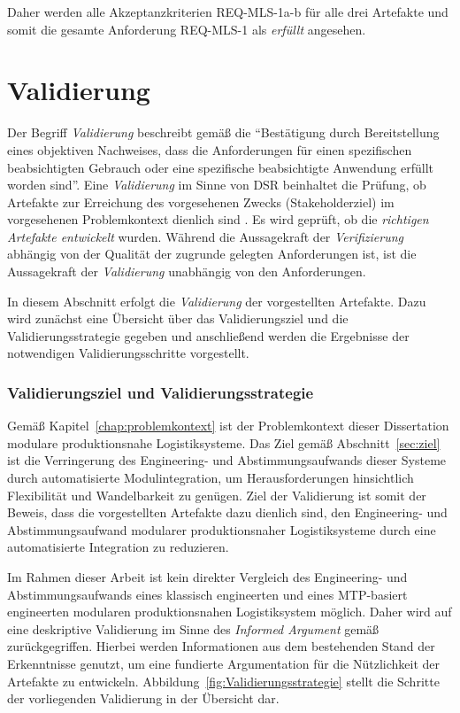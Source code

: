 Daher werden alle Akzeptanzkriterien REQ-MLS-1a-b für alle drei Artefakte und somit die gesamte Anforderung REQ-MLS-1 als \emph{erfüllt} angesehen.


\section{Validierung}
\label{sec:Validierung}

Der Begriff \emph{Validierung} beschreibt gemäß \cite{DINNormenausschussQualitatsmanagementStatistikundZertifizierungsgrundlagen.2015} die \enquote{Bestätigung durch Bereitstellung eines objektiven Nachweises, dass die Anforderungen für einen spezifischen beabsichtigten Gebrauch oder eine spezifische beabsichtigte Anwendung erfüllt worden sind}. Eine \emph{Validierung} im Sinne von DSR beinhaltet die Prüfung, ob Artefakte zur Erreichung des vorgesehenen Zwecks (Stakeholderziel) im vorgesehenen Problemkontext dienlich sind \cite{Wieringa.2014}. Es wird geprüft, ob die \emph{richtigen Artefakte entwickelt} wurden. Während die Aussagekraft der \emph{Verifizierung} abhängig von der Qualität der zugrunde gelegten Anforderungen ist, ist die Aussagekraft der \emph{Validierung} unabhängig von den Anforderungen.

In diesem Abschnitt erfolgt die \emph{Validierung} der vorgestellten Artefakte. Dazu wird zunächst eine Übersicht über das Validierungsziel und die Validierungsstrategie gegeben und anschließend werden die Ergebnisse der notwendigen Validierungsschritte vorgestellt.

\subsubsection{Validierungsziel und Validierungsstrategie}

Gemäß Kapitel~\ref{chap:problemkontext} ist der Problemkontext dieser Dissertation modulare produktionsnahe Logistiksysteme. Das Ziel gemäß Abschnitt~\ref{sec:ziel} ist die Verringerung des Engineering- und Abstimmungsaufwands dieser Systeme durch automatisierte Modulintegration, um Herausforderungen hinsichtlich Flexibilität und Wandelbarkeit zu genügen. Ziel der Validierung ist somit der Beweis, dass die vorgestellten Artefakte dazu dienlich sind, den Engineering- und Abstimmungsaufwand modularer produktionsnaher Logistiksysteme durch eine automatisierte Integration zu reduzieren. 

Im Rahmen dieser Arbeit ist kein direkter Vergleich des Engineering- und Abstimmungsaufwands eines klassisch engineerten und eines MTP-basiert engineerten modularen produktionsnahen Logistiksystem möglich. Daher wird auf eine deskriptive Validierung im Sinne des \emph{Informed Argument} gemäß \cite{Hevner.2004} zurückgegriffen. Hierbei werden Informationen aus dem bestehenden Stand der Erkenntnisse genutzt, um eine fundierte Argumentation für die Nützlichkeit der Artefakte zu entwickeln. Abbildung~\ref{fig:Validierungsstrategie} stellt die Schritte der vorliegenden Validierung in der Übersicht dar. 

